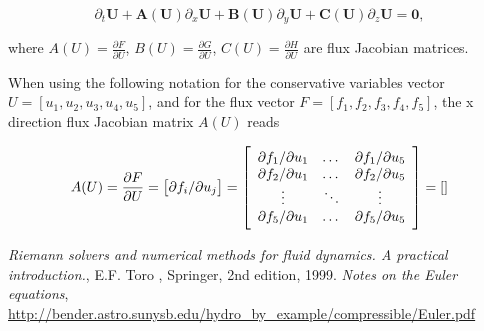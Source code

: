 \documentclass{article}
\begin{document}
\begin{equation}
  \partial_t \mathbf{U} + \mathbf{A(U)} \partial_x \mathbf{U} + \mathbf{B(U)} \partial_y \mathbf{U} + \mathbf{C(U)} \partial_z \mathbf{U} = \mathbf{0},
\end{equation}

where $A(U)=\frac{\partial F}{\partial U}$, $B(U)=\frac{\partial G}{\partial U}$, $C(U)=\frac{\partial H}{\partial U}$ are flux Jacobian matrices.

When using the following notation for the conservative variables vector $U=[u_1, u_2, u_3, u_4, u_5]$, and for the flux vector $F=[f_1, f_2, f_3, f_4, f_5]$, the x direction flux Jacobian matrix $A(U)$ reads

\begin{equation}
  A(U)=\frac{\partial F}{\partial U} = \left[ \partial f_i/\partial u_j \right] = \left [
    \begin{array}{c c c}
      \partial f_1/\partial u_1 & \dots & \partial f_1/\partial u_5\\
      \partial f_2/\partial u_1 & \dots & \partial f_2/\partial u_5\\
      \vdots & \ddots & \vdots\\
      \partial f_5/\partial u_1 & \dots & \partial f_5/\partial u_5\\
    \end{array} \right ]
  = \left[
    \begin{array}{c c c c c}
      
    \end{array} \right ]
\end{equation}

\begin{thebibliography}{9}
 \emph{Riemann solvers and numerical methods for fluid dynamics. A practical introduction.}, E.F. Toro , Springer, 2nd edition, 1999.
 \emph{Notes on the Euler equations}, \url{http://bender.astro.sunysb.edu/hydro_by_example/compressible/Euler.pdf}
\end{thebibliography}
\end{document}
